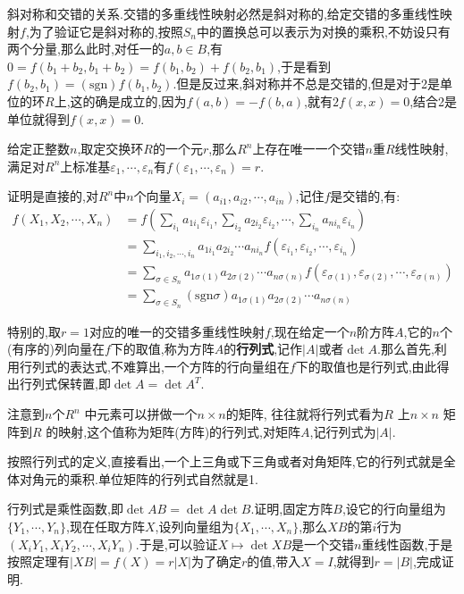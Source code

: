 斜对称和交错的关系.交错的多重线性映射必然是斜对称的,给定交错的多重线性映射$f$,为了验证它是斜对称的,按照$S_n$中的置换总可以表示为对换的乘积,不妨设只有两个分量,那么此时,对任一的$a,b\in B$,有$0=f(b_1+b_2,b_1+b_2)=f(b_1,b_2)+f(b_2,b_1)$,于是看到$f(b_2,b_1)=(\mathrm{sgn})f(b_1,b_2)$.但是反过来,斜对称并不总是交错的,但是对于2是单位的环$R$上,这的确是成立的,因为$f(a,b)=-f(b,a)$,就有$2f(x,x)=0$,结合2是单位就得到$f(x,x)=0$.

给定正整数$n$,取定交换环$R$的一个元$r$,那么$R^n$上存在唯一一个交错$n$重$R$线性映射,满足对$R^n$上标准基$\varepsilon_1,\cdots,\varepsilon_n$有$f(\varepsilon_1,\cdots,\varepsilon_n)=r$.

证明是直接的,对$R^n$中$n$个向量$X_i=(a_{i1},a_{i2},\cdots,a_{in})$,记住$f$是交错的,有:
\begin{align*}
f(X_1,X_2,\cdots,X_n)&=f(\sum_{i_1}a_{1i_1}\varepsilon_{i_1},\sum_{i_2}a_{2i_2}\varepsilon_{i_2},
\cdots,\sum_{i_n}a_{ni_n}\varepsilon_{i_n})\\
&=\sum_{i_1,i_2,\cdots,i_n}a_{1i_1}a_{2i_2}\cdots a_{ni_n}f(\varepsilon_{i_1},\varepsilon_{i_2},\cdots,\varepsilon_{i_n})\\
&=\sum_{\sigma\in S_n}a_{1\sigma(1)}a_{2\sigma(2)}\cdots a_{n\sigma(n)}f(\varepsilon_{\sigma(1)},\varepsilon_{\sigma(2)},\cdots,\varepsilon_{\sigma(n)})\\
&=\sum_{\sigma\in S_n}(\mathrm{sgn}\sigma)a_{1\sigma(1)}a_{2\sigma(2)}\cdots a_{n\sigma(n)}
\end{align*}

特别的,取$r=1$对应的唯一的交错多重线性映射$f$,现在给定一个$n$阶方阵$A$,它的$n$个(有序的)列向量在$f$下的取值,称为方阵$A$的\textbf{行列式},记作$|A|$或者$\det A$.那么首先,利用行列式的表达式,不难算出,一个方阵的行向量组在$f$下的取值也是行列式,由此得出行列式保转置,即$\det A=\det A^T$.

注意到$n$个$R^n$ 中元素可以拼做一个$n\times n$的矩阵, 往往就将行列式看为$R$ 上$n\times n$ 矩阵到$R$ 的映射,这个值称为矩阵(方阵)的行列式,对矩阵$A$,记行列式为$|A|$.

按照行列式的定义,直接看出,一个上三角或下三角或者对角矩阵,它的行列式就是全体对角元的乘积.单位矩阵的行列式自然就是1.

行列式是乘性函数,即$\det AB=\det A\det B$.证明,固定方阵$B$,设它的行向量组为$\{Y_1,\cdots,Y_n\}$,现在任取方阵$X$,设列向量组为$\{X_1,\cdots,X_n\}$,那么$XB$的第$i$行为$(X_iY_1,X_iY_2,\cdots,X_iY_n)$.于是,可以验证$X\mapsto\det XB$是一个交错$n$重线性函数,于是按照定理有$|XB|=f(X)=r|X|$为了确定$r$的值,带入$X=I$,就得到$r=|B|$,完成证明.

